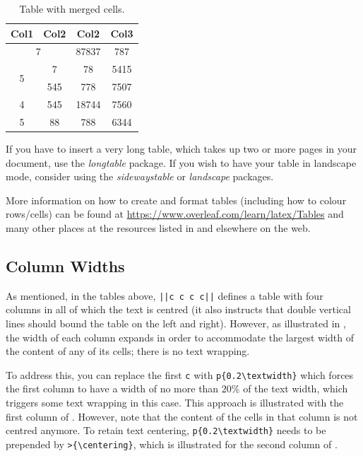 \documentclass[11pt,twoside,openright]{report}
\begin{document}
\begin{table}[!ht]
 \centering
 \caption{Table with merged cells.}
 \label{tab:MySecondTable}
 \begin{tabular}{||cccc||} 
 \hline
 Col1 & Col2 & Col2 & Col3 \\
 \hline\hline
 \multicolumn{2}{||c}{7} & 87837 & 787 \\  
 \multirow{2}{*}{5} & 7 & 78 & 5415 \\ 
   & 545 & 778 & 7507 \\
 4 & 545 & 18744 & 7560 \\
 5 & 88 & 788 & 6344 \\
 \hline
 \end{tabular}
\end{table}

If you have to insert a very long table, which takes up two or more pages in your document, use the \emph{longtable} package. If you wish to have your table in landscape mode, consider using the \emph{sidewaystable} or \emph{landscape} packages.  

More information on how to create and format tables (including how to colour rows/cells) can be found at \url{https://www.overleaf.com/learn/latex/Tables} and many other places at the resources listed in  and elsewhere on the web.




\subsection{Column Widths}
\label{sec:TableColumnWidths}

As mentioned, in the tables above, \verb!||c c c c||! defines a table with four columns in all of which the text is centred (it also instructs that double vertical lines should bound the table on the left and right).
However, as illustrated in , the width of each column expands in order to accommodate the largest width of the content of any of its cells; there is no text wrapping.

To address this, you can replace the first \verb|c| with \verb|p{0.2\textwidth}| which forces the first column to have a width of no more than $20\%$ of the text width, which triggers some text wrapping in this case.
This approach is illustrated with the first column of .
However, note that the content of the cells in that column is not centred anymore. 
To retain text centering, \verb|p{0.2\textwidth}| needs to be prepended by \verb|>{\centering}|, which is illustrated for the second column of .
\end{document}
